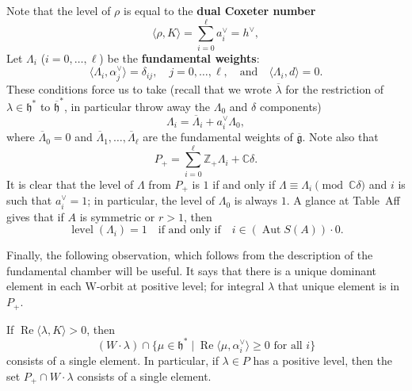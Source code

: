 \documentclass[12pt]{article}
\begin{document}
Note that the level of $\rho$ is equal to the \textbf{dual Coxeter number}
\begin{equation}\label{eq:12.4.2}
    \langle \rho, K \rangle = \sum_{i=0}^{\ell} a_i^{\vee} = h^{\vee},
\end{equation}
Let $\Lambda_i$ ($i = 0, \dots, \ell$) be the \textbf{fundamental weights}:
\[
    \langle \Lambda_i, \alpha_j^{\vee} \rangle = \delta_{ij}, \quad j = 0, \dots, \ell, \quad \text{and} \quad \langle \Lambda_i, d \rangle = 0.
\]
These conditions force us to take (recall that we wrote $\overline{\lambda}$ for the restriction of $\lambda \in \mathfrak{h}^*$ to $\overline{\mathfrak{h}}^*$, in particular throw away the $\Lambda_0$ and $\delta$ components)
\begin{equation}\label{eq:12.4.3}
    \Lambda_i = \overline{\Lambda}_i + a_i^{\vee} \Lambda_0,
\end{equation}
where $\overline{\Lambda}_0 = 0$ and $\overline{\Lambda}_1, \dots, \overline{\Lambda}_\ell$ are the fundamental weights of $\overline{\mathfrak{g}}$. Note also that
\begin{equation}\label{eq:12.4.4}
    P_+ = \sum_{i=0}^{\ell} \mathbb{Z}_+ \Lambda_i + \mathbb{C}\delta.
\end{equation}
It is clear that the level of $\Lambda$ from $P_+$ is $1$ if and only if $\Lambda \equiv \Lambda_i \pmod{\mathbb{C}\delta}$ and $i$ is such that $a_i^{\vee} = 1$; in particular, the level of $\Lambda_0$ is always $1$. A glance at Table~Aff gives that if $A$ is symmetric or $r > 1$, then
\begin{equation}\label{eq:12.4.5}
    \operatorname{level}(\Lambda_i) = 1 \quad \text{if and only if} \quad i \in (\operatorname{Aut} S(A)) \cdot 0.
\end{equation}

Finally, the following observation, which follows from the description of the fundamental chamber will be useful. It says that there is a unique dominant element in each W-orbit at positive level; for integral $\lambda$ that unique element is in $P_+$.
\begin{lemma}[12.4]
    If $\operatorname{Re}\langle \lambda, K \rangle > 0$, then
    \[(W \cdot \lambda) \cap \{ \mu \in \mathfrak{h}^* \mid \operatorname{Re}\langle \mu, \alpha_i^\vee \rangle \ge 0 \text{ for all } i \}\]
    consists of a single element. In particular, if $\lambda \in P$ has a positive level, then the set $P_+ \cap W \cdot \lambda$ consists of a single element.
\end{lemma}
\end{document}
